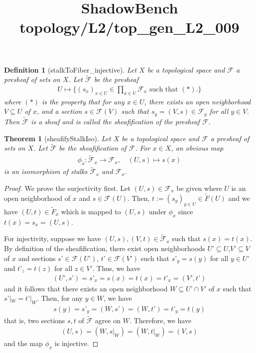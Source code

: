 \documentclass{article}
\title{ShadowBench topology/L2/top\_gen\_L2\_009}
\newtheorem{theorem}{Theorem}
\newtheorem{definition}{Definition}
\begin{document}
\maketitle

\begin{definition}[stalkToFiber_injective]
	Let $X$ be a topological space and $\mathcal{F}$ a presheaf of sets on $X$. Let $\widetilde{\mathcal{F}}$ be the presheaf 
\begin{align*}
U \mapsto \{(s_x)_{x \in U} \in \prod_{x \in U} \mathcal{F}_x  \text{ such that $(*)$.}\}
\end{align*}
where $(*)$ is the property that for any $x \in U$, there exists an open neighborhood $V \subseteq U$ of $x$, and a section $s \in \mathcal{F}(V)$ such that $s_y = (V,s) \in \mathcal{F}_y$ for all $y \in V$. Then $\widetilde{\mathcal{F}}$ is a sheaf and is called the sheafification of the presheaf $\mathcal{F}$.
\end{definition}

\begin{theorem}[sheafifyStalkIso]
	Let $X$ be a topological space and $\mathcal{F}$ a presheaf of sets on $X$. Let $\widetilde{\mathcal{F}}$ be the sheafification of $\mathcal{F}$. For $x \in X$, an obvious map
\begin{align*}
	\phi_x: \widetilde{\mathcal{F}}_x \to \mathcal{F}_x, \quad (U,s) \mapsto s(x)
\end{align*}
is an isomorphism of stalks $\widetilde{\mathcal{F}}_x$ and $\mathcal{F}_x$.
\end{theorem}

\begin{proof}
We prove the surjectivity first. Let $(U,s) \in \mathcal{F}_x$ be given where $U$ is an open neighborhood of $x$ and $s \in \mathcal{F}(U)$. Then, $t:=(s_y)_{y \in U} \in \widetilde{F}(U)$ and we have $(U,t) \in \widetilde{F}_x$ which is mapped to $(U,s)$ under $\phi_x$ since $t(x) = s_x = (U,s)$.

For injectivity, suppose we have $(U,s), (V,t) \in \widetilde{\mathcal{F}}_x$ such that $s(x) = t(x)$. By definition of the sheafification, there exist open neighborhoods $U’\subseteq U$,$V’\subseteq V$ of $x$ and sections $s’ \in \mathcal{F}(U’)$, $t’ \in \mathcal{F}(V’)$ such that $s’_y = s(y)$ for all $y \in U’$ and $t’_z = t(z)$ for all $z \in V’$. Thus, we have
\begin{align*}
(U’,s’) = s’_x = s(x) = t(x) = t’_x = (V’,t’)
\end{align*}
and it follows that there exists an open neighborhood $W \subseteq U’ \cap V’$ of $x$ such that $s’|_W = t’|_W$. Then, for any $y \in W$, we have
\begin{align*}
	s(y) = s’_y = (W,s’) = (W,t’) = t’_y = t(y)
\end{align*}
that is, two sections $s,t$ of $\widetilde{\mathcal{F}}$ agree on $W$. Therefore, we have
\begin{align*}
	(U,s) = (W,s|_W) = (W,t|_W) = (V,s)
\end{align*}
and the map $\phi_x$ is injective.
\end{proof}
\end{document}
